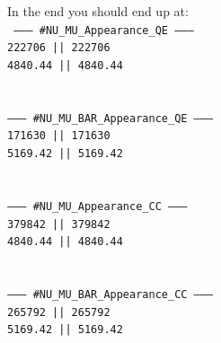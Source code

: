 \documentclass[12pt,a4paper]{article}
\theoremstyle{dotless}
\begin{document}
\newpage
In the end you should end up at:\\

{\tt
\hspace*{2cm} --------- \#NU\_MU\_Appearance\_QE ---------\\
\hspace*{2cm}               222706 ||       222706\\
\hspace*{2cm}              4840.44 ||      4840.44\\
\hspace*{2cm} \\
\hspace*{2cm} \\
\hspace*{2cm} --------- \#NU\_MU\_BAR\_Appearance\_QE ---------\\
\hspace*{2cm}               171630 ||       171630\\
\hspace*{2cm}              5169.42 ||      5169.42\\
\hspace*{2cm} \\
\hspace*{2cm} \\
\hspace*{2cm} --------- \#NU\_MU\_Appearance\_CC ---------\\
\hspace*{2cm}               379842 ||       379842\\
\hspace*{2cm}              4840.44 ||      4840.44\\
\hspace*{2cm} \\
\hspace*{2cm} \\
\hspace*{2cm} --------- \#NU\_MU\_BAR\_Appearance\_CC ---------\\
\hspace*{2cm}               265792 ||       265792\\
\hspace*{2cm}              5169.42 ||      5169.42\\
}
\end{document}

